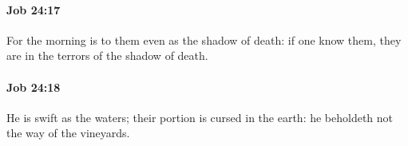 		\paragraph{Job 24:17} %
			\label{JOB-24-17}

			For the morning is to them even as the shadow of death: if one know them, they are in the terrors of the shadow of death.


		\paragraph{Job 24:18} %
			\label{JOB-24-18}

			He is swift as the waters; their portion is cursed in the earth: he beholdeth not the way of the vineyards.


